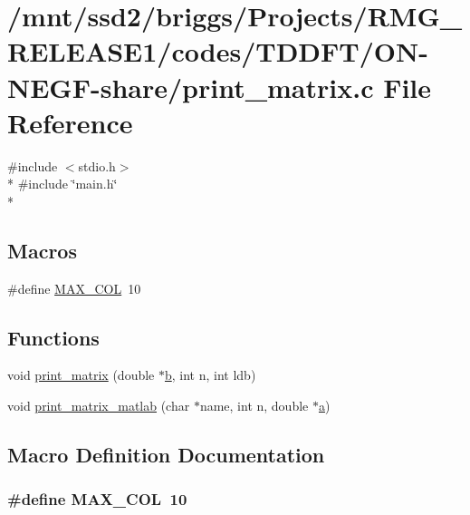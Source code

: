 \hypertarget{_t_d_d_f_t_2_o_n-_n_e_g_f-share_2print__matrix_8c}{\section{/mnt/ssd2/briggs/\-Projects/\-R\-M\-G\-\_\-\-R\-E\-L\-E\-A\-S\-E1/codes/\-T\-D\-D\-F\-T/\-O\-N-\/\-N\-E\-G\-F-\/share/print\-\_\-matrix.c File Reference}
\label{_t_d_d_f_t_2_o_n-_n_e_g_f-share_2print__matrix_8c}
}
{\ttfamily \#include $<$stdio.\-h$>$}\\*
{\ttfamily \#include \char`\"{}main.\-h\char`\"{}}\\*
\subsection*{Macros}
\begin{DoxyCompactItemize}
\item 
\#define \hyperlink{_t_d_d_f_t_2_o_n-_n_e_g_f-share_2print__matrix_8c_a97e80440b5a5ec2ffc172dead9f8d2ec}{M\-A\-X\-\_\-\-C\-O\-L}~10
\end{DoxyCompactItemize}
\subsection*{Functions}
\begin{DoxyCompactItemize}
\item 
void \hyperlink{_t_d_d_f_t_2_o_n-_n_e_g_f-share_2print__matrix_8c_aa262f6850c59bfe3c837f4457dcbc36d}{print\-\_\-matrix} (double $\ast$\hyperlink{gga__xc__th_8c_a5dd9476685b5767af6e72579b9d3b42e}{b}, int n, int ldb)
\item 
void \hyperlink{_t_d_d_f_t_2_o_n-_n_e_g_f-share_2print__matrix_8c_ab9b117a0017293862b5bced5301729f6}{print\-\_\-matrix\-\_\-matlab} (char $\ast$name, int n, double $\ast$\hyperlink{gga__xc__th_8c_abf59cc952e724dd76e644ff9480786d9}{a})
\end{DoxyCompactItemize}


\subsection{Macro Definition Documentation}
\hypertarget{_t_d_d_f_t_2_o_n-_n_e_g_f-share_2print__matrix_8c_a97e80440b5a5ec2ffc172dead9f8d2ec}{
\subsubsection[{M\-A\-X\-\_\-\-C\-O\-L}]{\setlength{\rightskip}{0pt plus 5cm}\#define M\-A\-X\-\_\-\-C\-O\-L~10}}\label{_t_d_d_f_t_2_o_n-_n_e_g_f-share_2print__matrix_8c_a97e80440b5a5ec2ffc172dead9f8d2ec}


